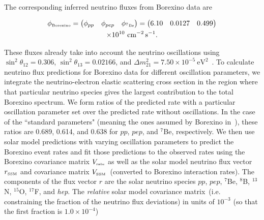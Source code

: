 \documentclass[aps,prd,reprint,superscriptaddress,floatfix,altaffilletter,nofootinbib]{revtex4-2}
\begin{document}
The corresponding inferred neutrino fluxes from Borexino data are

\begin{multline}
    \phi_{\mbox{\tiny Borexino}} =  \begin{pmatrix}
    \phi_{pp} & \phi_{pep} & \phi_{^7\mbox{\tiny Be}}
    \end{pmatrix}
     =  \begin{pmatrix} 
    6.10 & 0.0127 & 0.499
    \end{pmatrix} \\
    \times 10^{10}~\mathrm{cm^{-2}\, s^{-1}}. \notag
\end{multline}
    


These fluxes already take into account the neutrino oscillations using $\sin^{2}\theta_{12}=0.306$, $\sin^{2}\theta_{13}=0.02166$, and $\Delta m^{2}_{21}=7.50\times 10^{-5}~\mathrm{eV}^{2}$~\cite{Agostini:2019}. To calculate neutrino flux predictions for Borexino data for different oscillation parameters, we integrate the neutrino-electron elastic scattering cross section in the region where that particular neutrino species gives the largest contribution to the total Borexino spectrum. We form ratios of the predicted rate with a particular oscillation parameter set over the predicted rate without oscillations. In the case of the ``standard parameters" (meaning the ones assumed by Borexino in~\cite{Agostini:2019}), these ratios are 0.689, 0.614, and 0.638 for $pp$, $pep$, and $^{7}$Be, respectively. We then use solar model predictions with varying oscillation parameters to predict the Borexino event rates and fit those predictions to the observed rates using the Borexino covariance matrix $V_{\mbox{\tiny rate}}$ as well as the solar model neutrino flux 
vector $r_{\mbox{\tiny SSM}}$ and
covariance matrix $V_{\mbox{\tiny SSM}}$~(converted to Borexino interaction rates). 
The components of the flux vector $r$ are the solar neutrino species $pp$, $pep$, $^7$Be, $^8$B, $^{13}$N, $^{15}$O, $^{17}$F, and {\it hep}. 
The {\it relative} solar model covariance matrix~(i.e. constraining the fraction of the neutrino flux deviations) in units of $10^{-3}$ (so that the first fraction is $1.0 \times 10^{-4}$)
\end{document}
